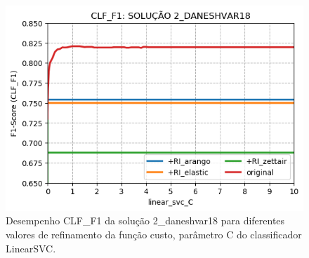\begin{figure}[h]
    \centering
    \caption{Desempenho CLF\_F1 da solução 2\_daneshvar18 para diferentes valores de refinamento da função custo, parâmetro C do classificador LinearSVC.}
    \vspace{-0.0cm}
    \begin{center}
        \includegraphics[width=1.0\textwidth]{img/clf-f1-2-daneshvar18.png}
    \end{center}
    \vspace{-0.0cm}
    \label{fig:clf-f1-2-daneshvar18}
\end{figure}